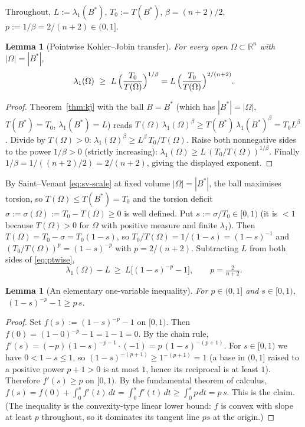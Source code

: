 \documentclass[11pt]{amsart}
\newtheorem{lemma}[theorem]{Lemma}
\theoremstyle{definition}
\newcommand{\R}{\mathbb R}
\newcommand{\Om}{\Omega}
\newcommand{\abs}[1]{\left|#1\right|}
\begin{document}
Throughout, $L:=\lambda_1(B^*)$, $T_0:=T(B^*)$, $\beta=(n+2)/2$,
$p:=1/\beta=2/(n+2)\in(0,1]$.

\begin{lemma}[Pointwise Kohler--Jobin transfer]\label{lem:ptwise}
For every open $\Om\subset\R^n$ with $\abs\Om=\abs{B^*}$,
\begin{equation}\label{eq:ptwise}
  \lambda_1(\Om)\ \ge\ L\,\Bigl(\frac{T_0}{T(\Om)}\Bigr)^{1/\beta}
  =L\,\Bigl(\frac{T_0}{T(\Om)}\Bigr)^{2/(n+2)} .
\end{equation}
\end{lemma}

\begin{proof}
Theorem~\ref{thm:kj} with the ball $B=B^*$ (which has $\abs{B^*}=\abs\Om$,
$T(B^*)=T_0$, $\lambda_1(B^*)=L$) reads
$T(\Om)\,\lambda_1(\Om)^\beta\ge T(B^*)\,\lambda_1(B^*)^\beta=T_0 L^\beta$.
Divide by $T(\Om)>0$:
$\lambda_1(\Om)^\beta\ge L^\beta\,T_0/T(\Om)$. Raise both nonnegative sides
to the power $1/\beta>0$ (strictly increasing):
$\lambda_1(\Om)\ge L\,(T_0/T(\Om))^{1/\beta}$. Finally $1/\beta=1/((n+2)/2)
=2/(n+2)$, giving the displayed exponent.
\end{proof}

By Saint--Venant \eqref{eq:sv-scale} at fixed volume $\abs\Om=\abs{B^*}$, the
ball maximises torsion, so $T(\Om)\le T(B^*)=T_0$ and the torsion deficit
$\sigma:=\sigma(\Om):=T_0-T(\Om)\ge0$ is well defined. Put
$s:=\sigma/T_0\in[0,1)$ (it is $<1$ because $T(\Om)>0$ for $\Om$ with
positive measure and finite $\lambda_1$). Then
$T(\Om)=T_0-\sigma=T_0(1-s)$, so $T_0/T(\Om)=1/(1-s)=(1-s)^{-1}$ and
$(T_0/T(\Om))^{p}=(1-s)^{-p}$ with $p=2/(n+2)$. Subtracting $L$ from both
sides of \eqref{eq:ptwise},
\begin{equation}\label{eq:ptwise-s}
  \lambda_1(\Om)-L\ \ge\ L\bigl[(1-s)^{-p}-1\bigr],\qquad p=\tfrac{2}{n+2}.
\end{equation}

\begin{lemma}[An elementary one-variable inequality]\label{lem:onevar}
For $p\in(0,1]$ and $s\in[0,1)$, $\ (1-s)^{-p}-1\ge p\,s$.
\end{lemma}

\begin{proof}
Set $f(s):=(1-s)^{-p}-1$ on $[0,1)$. Then $f(0)=(1-0)^{-p}-1=1-1=0$. By the
chain rule, $f'(s)=(-p)(1-s)^{-p-1}\cdot(-1)=p\,(1-s)^{-(p+1)}$. For
$s\in[0,1)$ we have $0<1-s\le1$, so $(1-s)^{-(p+1)}\ge1^{-(p+1)}=1$ (a base
in $(0,1]$ raised to a positive power $p+1>0$ is at most $1$, hence its
reciprocal is at least $1$). Therefore $f'(s)\ge p$ on $[0,1)$. By the
fundamental theorem of calculus, $f(s)=f(0)+\int_0^s f'(t)\,dt
=\int_0^s f'(t)\,dt\ge\int_0^s p\,dt=p\,s$. This is the claim. (The
inequality is the convexity-type linear lower bound: $f$ is convex with
slope at least $p$ throughout, so it dominates its tangent line $ps$ at the
origin.)
\end{proof}
\end{document}
